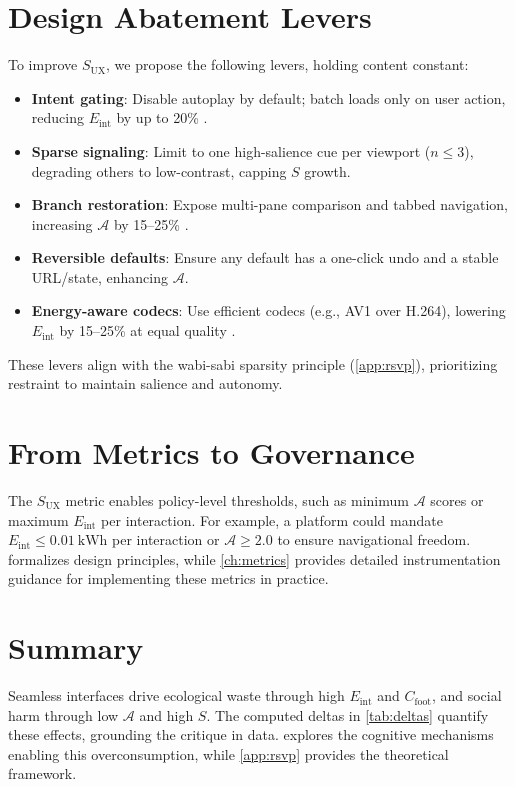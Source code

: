 \documentclass[openany]{book}
\newcommand{\Sent}{S} %
\newcommand{\Eint}{E_{\mathrm{int}}} %
\newcommand{\Cfoot}{C_{\mathrm{foot}}} %
\newcommand{\Auton}{\mathcal{A}} %
\newcommand{\SUX}{S_{\mathrm{UX}}} %
\newcommand{\kWh}{\mathrm{kWh}}
\begin{document}
\section{Design Abatement Levers}
\label{sec:abatement}
To improve $\SUX$, we propose the following levers, holding content constant:
\begin{itemize}
  \item \textbf{Intent gating}: Disable autoplay by default; batch loads only on user action, reducing $\Eint$ by up to 20\% \citep{extentia2024}.
  \item \textbf{Sparse signaling}: Limit to one high-salience cue per viewport ($n \leq 3$), degrading others to low-contrast, capping $\Sent$ growth.
  \item \textbf{Branch restoration}: Expose multi-pane comparison and tabbed navigation, increasing $\Auton$ by 15--25\% \citep{doctorow2022}.
  \item \textbf{Reversible defaults}: Ensure any default has a one-click undo and a stable URL/state, enhancing $\Auton$.
  \item \textbf{Energy-aware codecs}: Use efficient codecs (e.g., AV1 over H.264), lowering $\Eint$ by 15--25\% at equal quality \citep{extentia2024}.
\end{itemize}
These levers align with the wabi-sabi sparsity principle (\cref{app:rsvp}), prioritizing restraint to maintain salience and autonomy.

\section{From Metrics to Governance}
\label{sec:governance-preview}
The $\SUX$ metric enables policy-level thresholds, such as minimum $\Auton$ scores or maximum $\Eint$ per interaction. For example, a platform could mandate $\Eint \leq \SI{0.01}{\kWh}$ per interaction or $\Auton \geq 2.0$ to ensure navigational freedom.  formalizes design principles, while \cref{ch:metrics} provides detailed instrumentation guidance for implementing these metrics in practice.

\section{Summary}
Seamless interfaces drive ecological waste through high $\Eint$ and $\Cfoot$, and social harm through low $\Auton$ and high $\Sent$. The computed deltas in \cref{tab:deltas} quantify these effects, grounding the critique in data.  explores the cognitive mechanisms enabling this overconsumption, while \cref{app:rsvp} provides the theoretical framework.
\end{document}
